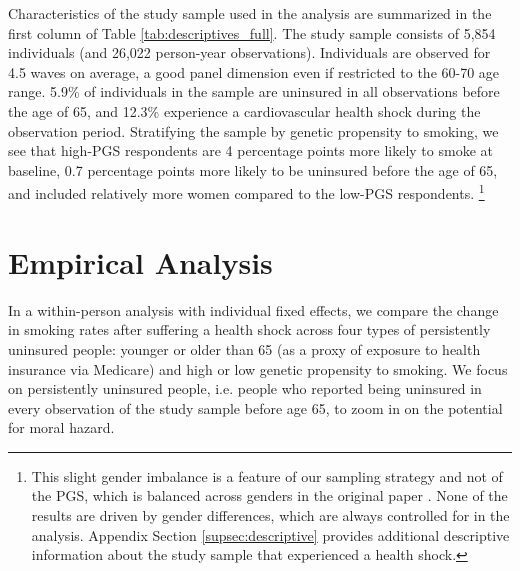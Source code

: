 \documentclass[11pt]{article}
\begin{document}
Characteristics of the study sample used in the analysis are summarized in the first column of Table \ref{tab:descriptives_full}.
The study sample consists of 5,854 individuals (and 26,022 person-year observations).
Individuals are observed for 4.5 waves on average, a good panel dimension even if restricted to the 60-70 age range.
5.9\% of individuals in the sample are uninsured in all observations before the age of 65, and 12.3\% experience a cardiovascular health shock during the observation period.
Stratifying the sample by genetic propensity to smoking, we see that high-PGS respondents are 4 percentage points more likely to smoke at baseline, 0.7 percentage points more likely to be uninsured before the age of 65, and included relatively more women compared to the low-PGS respondents.%
\footnote{This slight gender imbalance is a feature of our sampling strategy and not of the PGS, which is balanced across genders in the original paper \citep{GSCAN2019gwas}. None of the results are driven by gender differences, which are always controlled for in the analysis.
Appendix Section \ref{supsec:descriptive} provides additional descriptive information about the study sample that experienced a health shock.}

\section{Empirical Analysis}\label{sec:analysis}

In a within-person analysis with individual fixed effects, we compare the change in smoking rates after suffering a health shock across four types of persistently uninsured people: younger or older than 65 (as a proxy of exposure to health insurance via Medicare) and high or low genetic propensity to smoking.
We focus on persistently uninsured people, i.e. people who reported being uninsured in every observation of the study sample before age 65, to zoom in on the potential for moral hazard.
\end{document}
